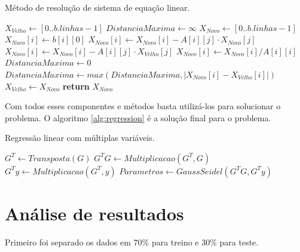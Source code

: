\documentclass[11pt]{article}
\begin{document}
\begin{algorithm}
  \caption{Método de resolução de sistema de equação linear.}\label{alg:gaussseidel}
  \begin{algorithmic}[1]
    \State $X_{Velho} \gets [0..b.linhas-1]$ 
    \State $DistanciaMaxima \gets \infty$
        \State $X_{Novo} \gets [0..b.linhas-1]$
            \State $X_{Novo}[i] \gets b[i][0]$
                        \State $X_{Novo}[i] \gets X_{Novo}[i] - A[i][j]\cdot X_{Novo}[j]$
                    \Else
                        \State $X_{Novo}[i] \gets X_{Novo}[i] - A[i][j]\cdot X_{Velho}[j]$
                    \EndIf
                \EndIf
            \EndFor
	    \State $X_{Novo}[i] \gets X_{Novo}[i]/A[i][i]$
        \EndFor
    \State $DistanciaMaxima \gets 0$
    \State $DistanciaMaxima \gets max(DistanciaMaxima,|X_{Novo}[i] - X_{Velho}[i]|)$
    \EndFor
    \State $X_{Velho} \gets X_{Novo}$
    \EndWhile
    \State \textbf{return} $X_{Novo}$
    \EndProcedure
  \end{algorithmic}
\end{algorithm}

Com todos esses componentes e métodos basta utilizá-los para solucionar o problema. O algoritmo \ref{alg:regression} é a solução final para o problema.

\begin{algorithm}
  \caption{Regressão linear com múltiplas variáveis.}\label{alg:regression}
  \begin{algorithmic}[1]
    \State $G^T \gets Transposta(G)$
    \State $G^TG \gets Multiplicacao(G^T,G)$
    \State $G^Ty \gets Multiplicacao(G^T,y)$
    \State $Parametros \gets GaussSeidel(G^TG,G^Ty)$
    \EndProcedure
  \end{algorithmic}
\end{algorithm}


\section{Análise de resultados}
\label{sec:org7ef48bc}

Primeiro foi separado os dados em 70\% para treino e 30\% para teste.
\end{document}
